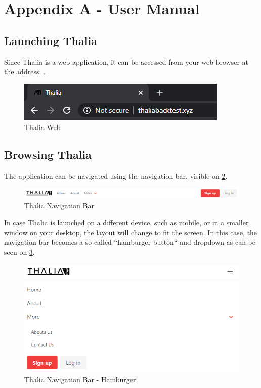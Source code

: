 \documentclass[main.tex]{subfiles}
\begin{document}
\section{Appendix A - User Manual}
\label{user_manual}

\subsection{Launching Thalia}
Since Thalia is a web application, it can be accessed from your web browser at the address: .

\begin{figure}[H]
   \centering
   \includegraphics[scale=0.8]{08Appendices/081User/081Pictures/thalia_domain.png}
   \caption{Thalia Web}
   \label{thalia_web}
\end{figure}

\subsection{Browsing Thalia}

The application can be navigated using the navigation bar, visible on \figurename{\ref{thalia_navbar}}.

\begin{figure}[H]
   \centering
   \includegraphics[width=\textwidth]{08Appendices/081User/081Pictures/navbar.png}
   \caption{Thalia Navigation Bar}
   \label{thalia_navbar}
\end{figure}

In case Thalia is launched on a different device, such as mobile, or in a smaller window on your desktop, the layout will change to fit the screen. In this case, the navigation bar becomes a so-called ``hamburger button`` and dropdown as can be seen on \figurename{\ref{thalia_navbar_hamburger}}.

\begin{figure}[H]
   \centering
   \includegraphics[width=\textwidth]{08Appendices/081User/081Pictures/navbar_hamburger.png}
   \caption{Thalia Navigation Bar - Hamburger}
   \label{thalia_navbar_hamburger}
\end{figure}
\end{document}
